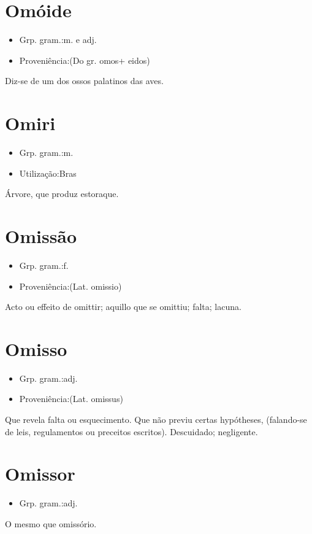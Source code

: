 \section{Omóide}
\begin{itemize}
\item {Grp. gram.:m.  e  adj.}
\end{itemize}
\begin{itemize}
\item {Proveniência:(Do gr. \textunderscore omos\textunderscore  + \textunderscore eidos\textunderscore )}
\end{itemize}
Diz-se de um dos ossos palatinos das aves.
\section{Omiri}
\begin{itemize}
\item {Grp. gram.:m.}
\end{itemize}
\begin{itemize}
\item {Utilização:Bras}
\end{itemize}
Árvore, que produz estoraque.
\section{Omissão}
\begin{itemize}
\item {Grp. gram.:f.}
\end{itemize}
\begin{itemize}
\item {Proveniência:(Lat. \textunderscore omissio\textunderscore )}
\end{itemize}
Acto ou effeito de omittir; aquillo que se omittiu; falta; lacuna.
\section{Omisso}
\begin{itemize}
\item {Grp. gram.:adj.}
\end{itemize}
\begin{itemize}
\item {Proveniência:(Lat. \textunderscore omissus\textunderscore )}
\end{itemize}
Que revela falta ou esquecimento.
Que não previu certas hypótheses, (falando-se de leis, regulamentos ou preceitos escritos).
Descuidado; negligente.
\section{Omissor}
\begin{itemize}
\item {Grp. gram.:adj.}
\end{itemize}
O mesmo que \textunderscore omissório\textunderscore .
